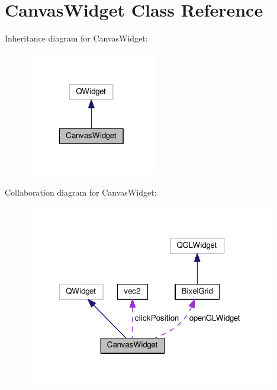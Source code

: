 \hypertarget{classCanvasWidget}{\section{Canvas\-Widget Class Reference}
\label{classCanvasWidget}
}


Inheritance diagram for Canvas\-Widget\-:\nopagebreak
\begin{figure}[H]
\begin{center}
\leavevmode
\includegraphics[width=160pt]{classCanvasWidget__inherit__graph}
\end{center}
\end{figure}


Collaboration diagram for Canvas\-Widget\-:\nopagebreak
\begin{figure}[H]
\begin{center}
\leavevmode
\includegraphics[width=309pt]{classCanvasWidget__coll__graph}
\end{center}
\end{figure}
